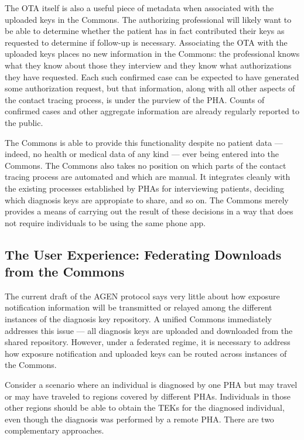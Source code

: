 The OTA itself is also a useful piece of metadata when associated with the uploaded keys in the Commons.
The authorizing professional will likely want to be able to determine whether the patient has in fact contributed their keys as requested to determine if follow-up is necessary.
Associating the OTA with the uploaded keys places no new information in the Commons: the professional knows what they know about those they interview and they know what authorizations they have requested.
Each such confirmed case can be expected to have generated some authorization request, but that information, along with all other aspects of the contact tracing process, is under the purview of the PHA.
Counts of confirmed cases and other aggregate information are already regularly reported to the public.

The Commons is able to provide this functionality despite no patient data --- indeed, no health or medical data of any kind --- ever being entered into the Commons.
The Commons also takes no position on which parts of the contact tracing process are automated and which are manual.
It integrates cleanly with the existing processes established by PHAs for interviewing patients, deciding which diagnosis keys are appropiate to share, and so on.
The Commons merely provides a means of carrying out the result of these decisions in a way that does not require individuals to be using the same phone app.

\subsection{The User Experience: Federating Downloads from the Commons}


The current draft of the AGEN protocol says very little about how exposure notification information will be transmitted or relayed among the different instances of the diagnosis key repository.
A unified Commons immediately addresses this issue --- all diagnosis keys are uploaded and downloaded from the shared repository.
However, under a federated regime, it is necessary to address how exposure notification and uploaded keys can be routed across instances of the Commons.

Consider a scenario where an individual is diagnosed by one PHA but may travel or may have traveled to regions covered by different PHAs.
Individuals in those other regions should be able to obtain the TEKs for the diagnosed individual, even though the diagnosis was performed by a remote PHA.
There are two complementary approaches.

